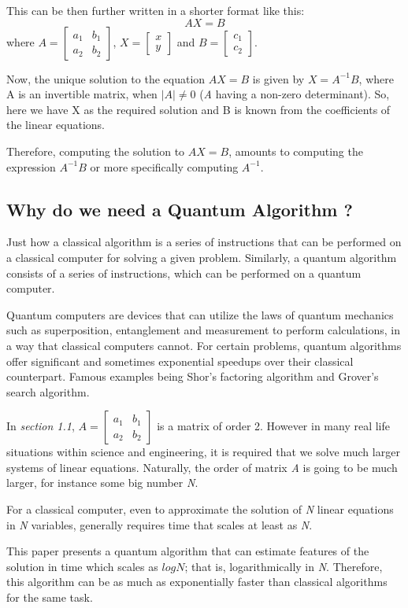 \documentclass[12pt]{article}
\begin{document}
This can be then further written in a shorter format like this:  
\begin{displaymath}
AX = B
\end{displaymath}
where $A = \begin{bmatrix}
a_1 & b_1\\
a_2 & b_2
\end{bmatrix} $, $X = \begin{bmatrix}
x\\
y
\end{bmatrix}$ and $B = \begin{bmatrix}
c_1\\
c_2
\end{bmatrix}$.\\ \hfill
\vspace{1mm}

Now, the unique solution to the equation $AX = B$ is given by $X = A^{-1} B$, where A is an invertible matrix, when $|A| \neq 0 $ (\emph{A} having a non-zero determinant). So, here we have X as the required solution and B is known from the coefficients of the linear equations.\par
Therefore, computing the solution to $AX = B$, amounts to computing the expression $A^{-1} B$ or more specifically computing $A^{-1}$.

\subsection{Why do we need a Quantum Algorithm ?}
Just how a classical algorithm is a series of instructions that can be performed on a classical computer for solving a given problem. Similarly, a quantum algorithm consists of a series of instructions, which can be performed on a quantum computer.\par
Quantum computers are devices that can utilize the laws of quantum mechanics such as superposition, entanglement and measurement to perform calculations, in a way that classical computers cannot. For certain problems, quantum algorithms offer significant and sometimes exponential speedups over their classical counterpart. Famous examples being Shor's factoring algorithm and Grover's search algorithm.\par
In \emph{section 1.1}, $A = \begin{bmatrix}
a_1 & b_1\\
a_2 & b_2
\end{bmatrix} $ is a matrix of order 2. However in many real life situations within science and engineering, it is required that we solve much larger systems of linear equations. Naturally, the order of matrix \emph{A} is going to be much larger, for instance some big number \emph{N}.\par  
For a classical computer, even to approximate the solution of \emph{N} linear equations in \emph{N} variables, generally requires time that scales at least as \emph{N}.\par
This paper presents a quantum algorithm that can estimate features of the solution in time which scales as $log N$; that is, logarithmically in \emph{N}. Therefore, this algorithm can be as much as exponentially faster than classical algorithms for the same task.\cite{HHL}
\end{document}
